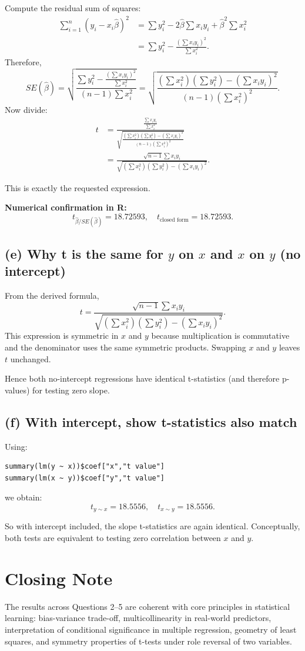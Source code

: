 \documentclass[12pt]{article}
\begin{document}
Compute the residual sum of squares:
\begin{align*}
\sum_{i=1}^n (y_i - x_i\hat\beta)^2
&= \sum y_i^2 -2\hat\beta\sum x_i y_i + \hat\beta^2\sum x_i^2 \\
&= \sum y_i^2 - \frac{\left(\sum x_i y_i\right)^2}{\sum x_i^2}.
\end{align*}
Therefore,
\[
SE(\hat\beta)=\sqrt{\frac{\sum y_i^2 - \frac{(\sum x_i y_i)^2}{\sum x_i^2}}{(n-1)\sum x_i^2}}
=\sqrt{\frac{(\sum x_i^2)(\sum y_i^2) - (\sum x_i y_i)^2}{(n-1)(\sum x_i^2)^2}}.
\]
Now divide:
\begin{align*}
t
&= \frac{\frac{\sum x_i y_i}{\sum x_i^2}}
{\sqrt{\frac{(\sum x_i^2)(\sum y_i^2) - (\sum x_i y_i)^2}{(n-1)(\sum x_i^2)^2}}} \\
&= \frac{\sqrt{n-1}\sum x_i y_i}
{\sqrt{(\sum x_i^2)(\sum y_i^2) - (\sum x_i y_i)^2}}.
\end{align*}

This is exactly the requested expression.

\textbf{Numerical confirmation in R:}
\[
 t_{\hat\beta/SE(\hat\beta)} = 18.72593,
\quad
 t_{\text{closed form}} = 18.72593.
\]

\subsection*{(e) Why t is the same for $y$ on $x$ and $x$ on $y$ (no intercept)}
From the derived formula,
\[
t = \frac{\sqrt{n-1}\sum x_i y_i}{\sqrt{(\sum x_i^2)(\sum y_i^2)- (\sum x_i y_i)^2}}.
\]
This expression is symmetric in $x$ and $y$ because multiplication is commutative and the denominator uses the same symmetric products. Swapping $x$ and $y$ leaves $t$ unchanged.

Hence both no-intercept regressions have identical t-statistics (and therefore p-values) for testing zero slope.

\subsection*{(f) With intercept, show t-statistics also match}
Using:
\begin{verbatim}
summary(lm(y ~ x))$coef["x","t value"]
summary(lm(x ~ y))$coef["y","t value"]
\end{verbatim}
we obtain:
\[
 t_{y\sim x} = 18.5556,
 \quad
 t_{x\sim y} = 18.5556.
\]

So with intercept included, the slope t-statistics are again identical. Conceptually, both tests are equivalent to testing zero correlation between $x$ and $y$.

\section*{Closing Note}
The results across Questions 2--5 are coherent with core principles in statistical learning: bias-variance trade-off, multicollinearity in real-world predictors, interpretation of conditional significance in multiple regression, geometry of least squares, and symmetry properties of t-tests under role reversal of two variables.
\end{document}
